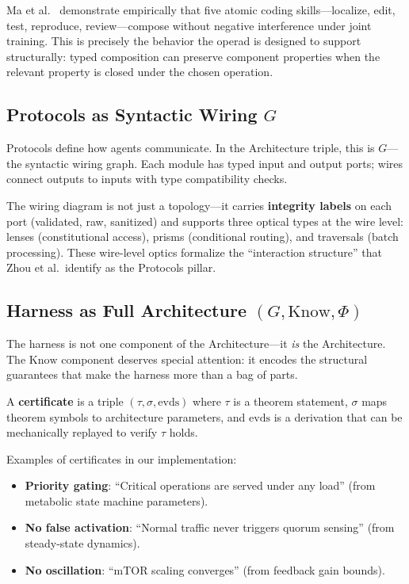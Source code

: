 Ma et al.~\cite{ma2026atomic} demonstrate empirically that five atomic coding skills---localize, edit, test, reproduce, review---compose without negative interference under joint training. This is precisely the behavior the operad is designed to support structurally: typed composition can preserve component properties when the relevant property is closed under the chosen operation.

\subsection{Protocols as Syntactic Wiring $G$}

Protocols define how agents communicate. In the Architecture triple, this is $G$---the syntactic wiring graph. Each module has typed input and output ports; wires connect outputs to inputs with type compatibility checks.

The wiring diagram is not just a topology---it carries \textbf{integrity labels} on each port (validated, raw, sanitized) and supports three optical types at the wire level: lenses (constitutional access), prisms (conditional routing), and traversals (batch processing). These wire-level optics formalize the ``interaction structure'' that Zhou et al.\ identify as the Protocols pillar.

\subsection{Harness as Full Architecture $(G, \mathrm{Know}, \Phi)$}

The harness is not one component of the Architecture---it \emph{is} the Architecture. The $\mathrm{Know}$ component deserves special attention: it encodes the structural guarantees that make the harness more than a bag of parts.

\begin{definition}
A \textbf{certificate} is a triple $(\tau, \sigma, \mathrm{evds})$ where $\tau$ is a theorem statement, $\sigma$ maps theorem symbols to architecture parameters, and $\mathrm{evds}$ is a derivation that can be mechanically replayed to verify $\tau$ holds.
\end{definition}

Examples of certificates in our implementation:
\begin{itemize}[leftmargin=*]
\item \textbf{Priority gating}: ``Critical operations are served under any load'' (from metabolic state machine parameters).
\item \textbf{No false activation}: ``Normal traffic never triggers quorum sensing'' (from steady-state dynamics).
\item \textbf{No oscillation}: ``mTOR scaling converges'' (from feedback gain bounds).
\end{itemize}

